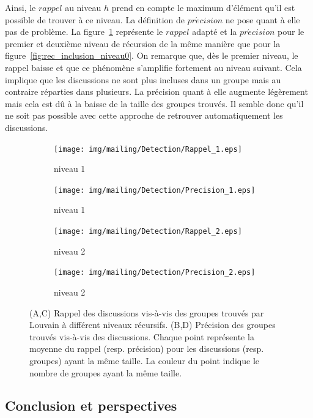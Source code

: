 Ainsi, le $rappel$ au niveau $h$ prend en compte le maximum d'élément qu'il est possible de trouver à ce niveau.
La définition de $pr\acute{e}cision$ ne pose quant à elle pas de problème.
La figure~\ref{fig:rec_inclusion} représente le $rappel$ adapté et la $pr\acute{e}cision$ pour le premier et deuxième niveau de récursion de la même manière que pour la figure~\ref{fig:rec_inclusion_niveau0}.
On remarque que, dès le premier niveau, le rappel baisse et que ce phénomène s'amplifie fortement au niveau suivant.
Cela implique que les discussions ne sont plus incluses dans un groupe mais au contraire réparties dans plusieurs.
La précision quant à elle augmente légèrement mais cela est dû à la baisse de la taille des groupes trouvés.
Il semble donc qu'il ne soit pas possible avec cette approche de retrouver automatiquement les discussions.


\begin{figure} [h]
\centering

	\begin{subfigure}{0.45\textwidth}
		\texttt{[image: img/mailing/Detection/Rappel\_1.eps]}
		\caption{niveau 1}		
	\end{subfigure}
	\begin{subfigure}{0.45\textwidth}
		\texttt{[image: img/mailing/Detection/Precision\_1.eps]}
		\caption{niveau 1}		
	\end{subfigure}
	
	\begin{subfigure}{0.45\textwidth}
		\texttt{[image: img/mailing/Detection/Rappel\_2.eps]}
		\caption{niveau 2}		
	\end{subfigure}
	\begin{subfigure}{0.45\textwidth}
		\texttt{[image: img/mailing/Detection/Precision\_2.eps]}
		\caption{niveau 2}		
	\end{subfigure}

\caption{(A,C) Rappel des discussions vis-à-vis des groupes trouvés par Louvain à différent niveaux récursifs.
(B,D) Précision des groupes trouvés vis-à-vis des discussions.
Chaque point représente la moyenne du rappel (resp. précision) pour les discussions (resp. groupes) ayant la même taille.
La couleur du point indique le nombre de groupes ayant la même taille.
}
\label{fig:rec_inclusion}
\end{figure}

\subsection{Conclusion et perspectives}

